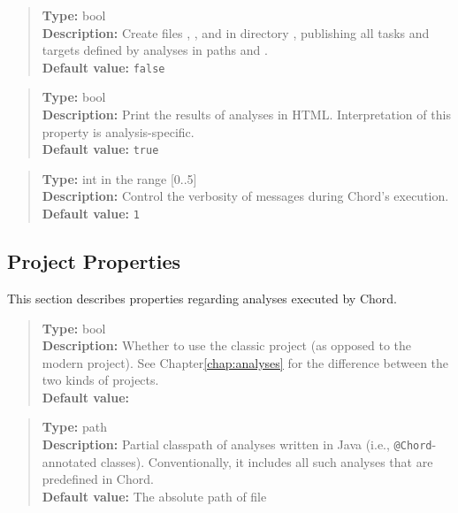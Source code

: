 \begin{quote}
{\bf Type:} bool \\
{\bf Description:} Create files , , and  in directory , publishing all tasks and targets defined by analyses in paths  and .  \\
{\bf Default value:} {\tt false}
\end{quote}

\begin{quote}
{\bf Type:} bool \\
{\bf Description:} Print the results of analyses in HTML.  Interpretation of this property is analysis-specific.  \\
{\bf Default value:} {\tt true}
\end{quote}

\begin{quote}
{\bf Type:} int in the range [0..5]  \\
{\bf Description:} Control the verbosity of messages during Chord's execution.  \\
{\bf Default value:} {\tt 1}
\end{quote}

\subsection{Project Properties}
\label{sec:project-props}

This section describes properties regarding analyses executed by Chord.

\begin{quote}
{\bf Type:} bool \\
{\bf Description:} Whether to use the classic project (as opposed to the modern project).  See Chapter\ref{chap:analyses} for the difference between the two kinds of projects. \\
{\bf Default value:} 
\end{quote}

\begin{quote}
{\bf Type:} path \\
{\bf Description:} Partial classpath of analyses written in Java (i.e., {\tt @Chord}-annotated classes).
Conventionally, it includes all such analyses that are predefined in Chord.  \\
{\bf Default value:} The absolute path of file 
\end{quote}

